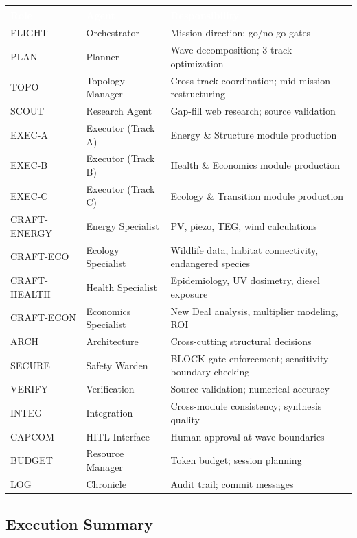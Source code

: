 \documentclass[11pt,letterpaper]{article}
\newcommand{\tableheader}[1]{\textbf{\sffamily\textcolor{white}{#1}}}
\begin{document}
\begin{center}
\begin{tabularx}{\textwidth}{L{2.5cm}L{3cm}X}
\toprule
{}
\tableheader{Role} & \tableheader{Agent} & \tableheader{Responsibility} \\
\midrule
FLIGHT & Orchestrator & Mission direction; go/no-go gates \\
PLAN & Planner & Wave decomposition; 3-track optimization \\
TOPO & Topology Manager & Cross-track coordination; mid-mission restructuring \\
SCOUT & Research Agent & Gap-fill web research; source validation \\
EXEC-A & Executor (Track A) & Energy \& Structure module production \\
EXEC-B & Executor (Track B) & Health \& Economics module production \\
EXEC-C & Executor (Track C) & Ecology \& Transition module production \\
CRAFT-ENERGY & Energy Specialist & PV, piezo, TEG, wind calculations \\
CRAFT-ECO & Ecology Specialist & Wildlife data, habitat connectivity, endangered species \\
CRAFT-HEALTH & Health Specialist & Epidemiology, UV dosimetry, diesel exposure \\
CRAFT-ECON & Economics Specialist & New Deal analysis, multiplier modeling, ROI \\
ARCH & Architecture & Cross-cutting structural decisions \\
SECURE & Safety Warden & BLOCK gate enforcement; sensitivity boundary checking \\
VERIFY & Verification & Source validation; numerical accuracy \\
INTEG & Integration & Cross-module consistency; synthesis quality \\
CAPCOM & HITL Interface & Human approval at wave boundaries \\
BUDGET & Resource Manager & Token budget; session planning \\
LOG & Chronicle & Audit trail; commit messages \\
\bottomrule
\end{tabularx}
\end{center}

\subsection{Execution Summary}
\end{document}
